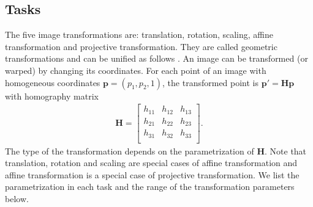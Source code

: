 \documentclass[conference]{IEEEtran}
\begin{document}
\subsection{Tasks}
The five image transformations are: translation, rotation, scaling, affine transformation and projective transformation. They are called geometric transformations and can be unified as follows  \cite{hartley2003multiple}. An image can be transformed (or warped) by changing its coordinates. For each point of an image with homogeneous coordinates $\mathbf{p}=(p_1,p_2,1)$, the transformed point is $\mathbf{p}' = \mathbf{Hp}$ with homography matrix
\begin{align}
\mathbf{H}=
  \begin{bmatrix}
    h_{11} & h_{12} & h_{13} \\ 
    h_{21} & h_{22} & h_{23} \\ 
    h_{31} & h_{32} & h_{33} \\     
  \end{bmatrix}.
\end{align}
The type of the transformation depends on the parametrization of $\mathbf{H}$. Note that translation, rotation and scaling are special cases of affine transformation and affine transformation is a special case of projective transformation.  
We list the parametrization in each task and the range of the transformation parameters below. 
\end{document}
